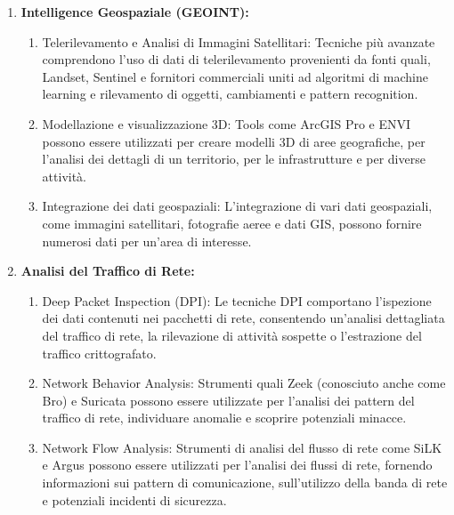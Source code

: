 \begin{enumerate}
\setcounter{enumi}{\value{TMPenumnbr}}
    \item \textbf{Intelligence Geospaziale (GEOINT):}
        \begin{enumerate}
            \item Telerilevamento e Analisi di Immagini Satellitari: Tecniche più avanzate comprendono l'uso di dati di telerilevamento provenienti da fonti quali, Landset, Sentinel e fornitori commerciali uniti ad algoritmi di machine learning e rilevamento di oggetti, cambiamenti e pattern recognition.
            \item Modellazione e visualizzazione 3D: Tools come ArcGIS Pro e ENVI possono essere utilizzati per creare modelli 3D di aree geografiche, per l'analisi dei dettagli di un territorio, per le infrastrutture e per diverse attività.
            \item Integrazione dei dati geospaziali: L'integrazione di vari dati geospaziali, come immagini satellitari, fotografie aeree e dati GIS, possono fornire numerosi dati per un'area di interesse.
        \end{enumerate}

    \item \textbf{Analisi del Traffico di Rete:}
        \begin{enumerate}
            \item Deep Packet Inspection (DPI): Le tecniche DPI comportano l'ispezione dei dati contenuti nei pacchetti di rete, consentendo un'analisi dettagliata del traffico di rete, la rilevazione di attività sospette o l'estrazione del traffico crittografato.
            \item Network Behavior Analysis: Strumenti quali Zeek (conosciuto anche come Bro) e Suricata possono essere utilizzate per l'analisi dei pattern del traffico di rete, individuare anomalie e scoprire potenziali minacce.
            \item Network Flow Analysis: Strumenti di analisi del flusso di rete come SiLK e Argus possono essere utilizzati per l'analisi dei flussi di rete, fornendo informazioni sui pattern di comunicazione, sull'utilizzo della banda di rete e potenziali incidenti di sicurezza.
        \end{enumerate}


\end{enumerate}
